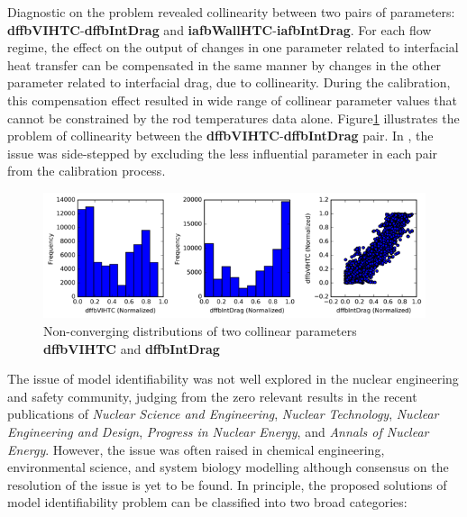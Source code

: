 \documentclass[11pt,titlepage]{article}
\begin{document}
Diagnostic on the problem revealed collinearity between two pairs of 
parameters: \textbf{dffbVIHTC}-\textbf{dffbIntDrag} and 
\textbf{iafbWallHTC}-\textbf{iafbIntDrag}. 
For each flow regime, the effect on the output of changes in one parameter 
related to interfacial heat transfer can be compensated in the same manner 
by changes in the other parameter related to interfacial drag, due to 
collinearity. 
During the calibration, this compensation effect resulted in wide range of 
collinear parameter values that cannot be constrained by the rod temperatures 
data alone. 
Figure\ref{fig:collinear} illustrates the problem of collinearity between the 
\textbf{dffbVIHTC}-\textbf{dffbIntDrag} pair. 
In \cite{Wicaksono2016}, the issue was side-stepped by excluding the less 
influential parameter in each pair from the calibration process.

\begin{figure}[h!]
	\centering
	\includegraphics[scale=0.90]{figures/collinear.png}
	\caption{Non-converging distributions of two collinear parameters
	    \textbf{dffbVIHTC} and \textbf{dffbIntDrag}}
	\label{fig:collinear}
\end{figure}

The issue of model identifiability was not well explored in the nuclear 
engineering and safety community, judging from the zero relevant results 
in the recent publications of \textit{Nuclear Science and Engineering}, 
\textit{Nuclear Technology}, \textit{Nuclear Engineering and Design}, 
\textit{Progress in Nuclear Energy}, and \textit{Annals of Nuclear Energy}. 
However, the issue was often raised in chemical engineering, 
environmental science, and system biology modelling although consensus 
on the resolution of the issue is yet to be found. 
In principle, the proposed solutions of model identifiability problem 
can be classified into two broad categories:
\end{document}
